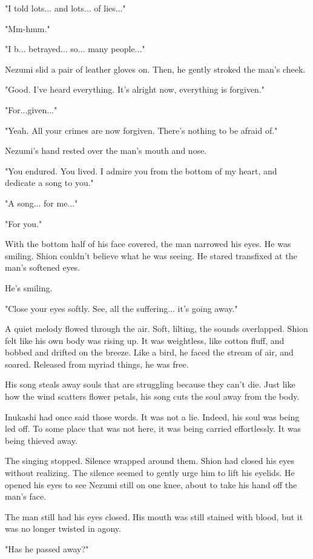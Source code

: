 "I told lots... and lots... of lies..."

"Mm-hmm."

"I b... betrayed... so... many people..."

Nezumi slid a pair of leather gloves on. Then, he gently stroked the
man's cheek.

"Good. I've heard everything. It's alright now, everything is forgiven."

"For...given..."

"Yeah. All your crimes are now forgiven. There's nothing to be afraid
of."

Nezumi's hand rested over the man's mouth and nose.

"You endured. You lived. I admire you from the bottom of my heart, and
dedicate a song to you."

"A song... for me..."

"For you."

With the bottom half of his face covered, the man narrowed his eyes. He
was smiling. Shion couldn't believe what he was seeing. He stared
transfixed at the man's softened eyes.

He's smiling.

"Close your eyes softly. See, all the suffering... it's going away."

A quiet melody flowed through the air. Soft, lilting, the sounds
overlapped. Shion felt like his own body was rising up. It was
weightless, like cotton fluff, and bobbed and drifted on the breeze.
Like a bird, he faced the stream of air, and soared. Released from
myriad things, he was free.

His song steals away souls that are struggling because they can't die.
Just like how the wind scatters flower petals, his song cuts the soul
away from the body.

Inukashi had once said those words. It was not a lie. Indeed, his soul
was being led off. To some place that was not here, it was being carried
effortlessly. It was being thieved away.

The singing stopped. Silence wrapped around them. Shion had closed his
eyes without realizing. The silence seemed to gently urge him to lift
his eyelids. He opened his eyes to see Nezumi still on one knee, about
to take his hand off the man's face.

The man still had his eyes closed. His mouth was still stained with
blood, but it was no longer twisted in agony.~

"Has he passed away?"

